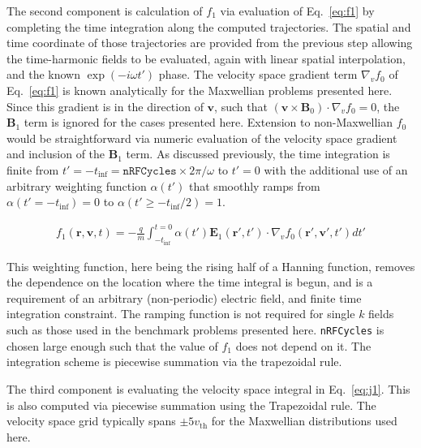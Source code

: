 \documentclass[final,5p,times,twocolumn]{elsarticle}
\newcounter{bla}
\renewcommand{\vec}[1]{\mathbf{#1}}
\begin{document}
The second component is calculation of $f_{\mathrm{1}}$ via evaluation of Eq.~\ref{eq:f1} by completing the time integration along the computed trajectories. The spatial and time coordinate of those trajectories are provided from the previous step allowing the time-harmonic fields to be evaluated, again with linear spatial interpolation, and the known $\exp{\left(-i\omega t'\right)}$ phase. The velocity space gradient term $\nabla_v f_{\mathrm{0}}$ of Eq.~\ref{eq:f1} is known analytically for the Maxwellian problems presented here. Since this gradient is in the direction of $\vec{v}$, such that $\left(\vec{v}\times\vec{B}_{\mathrm{0}}\right)\cdot\nabla_v f_{\mathrm{0}}=0$, the $\vec{B}_{\mathrm{1}}$ term is ignored for the cases presented here. Extension to non-Maxwellian $f_{\mathrm{0}}$ would be straightforward via numeric evaluation of the velocity space gradient and inclusion of the $\vec{B}_{\mathrm{1}}$ term. As discussed previously, the time integration is finite from $t'=-t_{\mathrm{inf}}=\texttt{nRFCycles}\times{2\pi}/\omega$ to $t'=0$ with the additional use of an arbitrary weighting function $\alpha\left(t'\right)$ that smoothly ramps from $\alpha\left(t'=-t_{\mathrm{inf}}\right)=0$ to $\alpha\left(t'\ge-t_{\mathrm{inf}}/2\right)=1$. 
%
\begin{linenomath}
\begin{equation}
\begin{split}
\label{eq:f1_2}
f_{\mathrm{1}}\left(\vec{r},\vec{v},t\right)=-\frac{q}{m}\int_{-t_\mathrm{inf}}^{t=0}
\alpha\left(t'\right)\vec{E}_{\mathrm{1}}\left(\vec{r}',t'\right) 
\hspace{0cm} \cdot\nabla_v f_{\mathrm{0}} \left(\vec{r}',\vec{v}',t'\right)dt'
\end{split}
\end{equation}
\end{linenomath}
%
This weighting function, here being the rising half of a Hanning function, removes the dependence on the location where the time integral is begun, and is a requirement of an arbitrary (non-periodic) electric field, and finite time integration constraint. The ramping function is not required for single $k$ fields such as those used in the benchmark problems presented here. \texttt{nRFCycles} is chosen large enough such that the value of $f_{\mathrm{1}}$ does not depend on it. The integration scheme is piecewise summation via the trapezoidal rule. 

The third component is evaluating the velocity space integral in Eq.~\ref{eq:j1}. This is also computed via piecewise summation using the Trapezoidal rule. The velocity space grid typically spans $\pm 5v_{\mathrm{th}}$ for the Maxwellian distributions used here.
%
\end{document}
